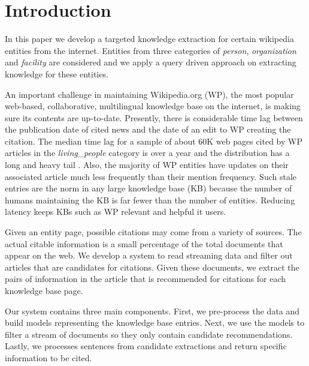 
\section{Introduction}

In this paper we develop a targeted knowledge extraction for certain wikipedia entities from the internet. Entities from three categories of \textit{person}, \textit{organization} and \textit{facility} are considered and we apply a query driven approach on extracting knowledge for these entities. 


An important challenge in maintaining Wikipedia.org (WP), the most popular 
web-based, collaborative, multilingual knowledge base on the internet, is  
making sure its contents are up-to-date. Presently, there is considerable time lag 
between the publication date of cited news and the date of an edit to WP 
creating the citation. The median time lag for a sample of about 60K
web pages cited by WP articles in the \textit{living\_people} category is over 
a year and the distribution has a long and heavy tail \cite{JFrank12}. 
Also, the majority of WP entities have updates on their associated article much 
less frequently than their mention frequency. Such stale entries 
are the norm in any large knowledge base (KB) because the number of humans 
maintaining the KB is far fewer than the number of entities. 
Reducing latency keeps KBs such as WP relevant and helpful it users.

Given an entity page, possible citations may come from a variety of sources.
The actual citable information is a small percentage of the total documents that appear on the web.
We develop a system to read streaming data and filter out articles that are candidates for citations.
Given these documents, we extract the pairs of information in the 
article that is recommended for citations for each knowledge base page.

Our system contains three main components. First, we pre-process the data and
build models representing the knowledge base entries.
Next, we use the models to filter a stream of documents so they only contain 
candidate recommendations.
Lastly, we processes sentences from candidate extractions and return 
specific information to be cited.


